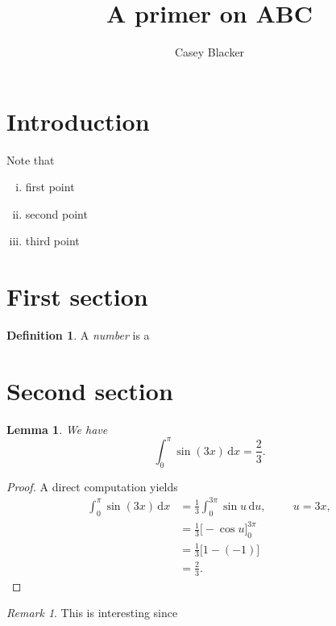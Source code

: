\documentclass{article}
\title{A primer on ABC}
\author{Casey Blacker}\date{}
\theoremstyle{plain}
\newtheorem{lemma}{Lemma}
\theoremstyle{definition}
\newtheorem{definition}{Definition}
\theoremstyle{remark}
\newtheorem{remark}{Remark}
\renewcommand{\d}{\mathrm{d}}
\begin{document}
\maketitle



\section*{Introduction}

Note that
\begin{enumerate}[i.,noitemsep]
	\item first point
	\item second point
	\item third point
\end{enumerate}




\section{First section}

\begin{definition}
	A \emph{number} is a\textellipsis
\end{definition}




\section{Second section}

\begin{lemma}
	We have
	\[
		\int_0^\pi \sin(3x)\,\d x = \frac{2}{3}.
	\]
\end{lemma}

\begin{proof}
	A direct computation yields
	\begin{align*}
		\int_0^\pi \sin(3x)\,\d x
			&=	\frac{1}{3}\int_0^{3\pi} \sin u \,\d u,		\hspace{1cm} u=3x,		\\
			&=	\frac{1}{3} \big[-\cos u\big]_0^{3\pi}						\\
			&=	\frac{1}{3} \big[1-(-1)\big]						\\
			&=	\frac{2}{3}.
	\end{align*}
\end{proof}

\begin{remark}
	This is interesting since\textellipsis
\end{remark}
\end{document}
